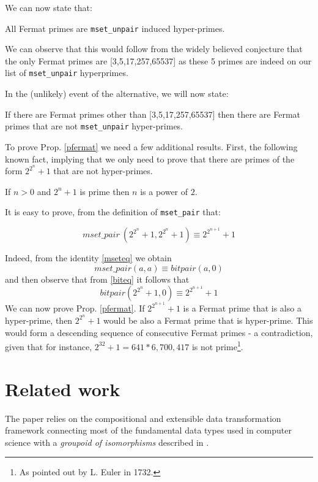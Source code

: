 \documentclass[]{INCLUDES/llncs}
\begin{document}
We can now state that:
\begin{conj}
All Fermat primes are {\tt mset\_unpair} induced hyper-primes.
\end{conj}
We can observe that this would follow from
the widely believed conjecture that the only Fermat primes are
[3,5,17,257,65537] as these 5 primes are indeed on our list of
{\tt mset\_unpair} hyperprimes.

In the (unlikely) event of the alternative, we will now state:
\begin{prop} \label{pfermat}
If there are Fermat primes other than [3,5,17,257,65537] then there are
Fermat primes that are not  {\tt mset\_unpair} hyper-primes.
\end{prop}
To prove Prop. \ref{pfermat} we need a few additional results.
First, the following known fact, implying that we only need to prove that there
are primes of the form $2^{2^n}+1$ that are not hyper-primes.
\begin{lem}
If $n>0$ and $2^n+1$ is prime then $n$ is a power of $2$. 
\end{lem}
It is easy to prove, from the definition of {\tt mset\_pair} that:
\begin{lem}
\begin{equation}
mset\_pair~(2^{2^n}+1,2^{2^n}+1) \equiv 2^{2^{n+1}}+1
\end{equation}
\end{lem}
Indeed, from the identity \ref{mseteq} we obtain
\begin{equation}
mset\_pair (a,a) \equiv bitpair (a,0)
\end{equation}
and then observe that from \ref{biteq} it follows that
\begin{equation}
bitpair (2^{2^n}+1,0) \equiv 2^{2^{n+1}}+1
\end{equation}
We can now prove Prop. \ref{pfermat}.
If $2^{2^{n+1}}+1$ is a Fermat prime that is also a
hyper-prime, then $2^{2^{n}}+1$ would be also a Fermat prime that is hyper-prime.
This would form a descending sequence of consecutive Fermat primes - a
contradiction, given that
for instance, $2^{32}+1 = 641 * 6,700,417$ is not prime\footnote{As pointed
out by L. Euler in 1732.}.


\section{Related work} \label{related}

The paper relies on the compositional and extensible data
transformation framework connecting most of the fundamental data types used in computer
science with a {\em groupoid of isomorphisms} described in \cite{arxiv:fISO}.
\end{document}
